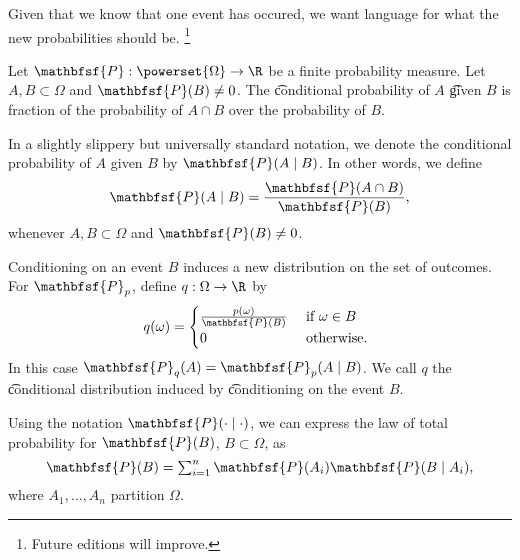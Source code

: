 

Given that we know that one event has occured, we want language for what the new probabilities should be.
  \ifhmode\unskip\fi\footnote{
Future editions will improve.
  }

Let $\mathbfsf{P} : \powerset{\Omega } \to \R $ be a finite probability measure.
Let $A, B \subset \Omega $ and $\mathbfsf{P} (B) \neq 0$.
The \t{conditional probability} of $A$ \t{given} $B$ is fraction of the probability of $A \cap B$ over the probability of $B$.

In a slightly slippery but universally standard notation, we denote the conditional probability of $A$ given $B$ by $\mathbfsf{P} (A \mid B)$.
In other words, we define
  \[
\mathbfsf{P} (A \mid B) = \frac{\mathbfsf{P} (A \cap B)}{\mathbfsf{P} (B)},
  \]
whenever $A, B \subset \Omega $ and $\mathbfsf{P} (B) \neq 0$.

Conditioning on an event $B$ induces a new distribution on the set of outcomes.
For $\mathbfsf{P} _p$, define $q: \Omega  \to \R $ by
  \[
q(\omega ) = \begin{cases}
\frac{p(\omega )}{\mathbfsf{P} (B)} & \text{ if } \omega  \in B \\
0 & \text{ otherwise. } \\
\end{cases}
  \]
In this case $\mathbfsf{P} _q(A) = \mathbfsf{P} _p(A \mid B)$.
We call $q$ the \t{conditional distribution} induced by \t{conditioning on} the event $B$.

Using the notation $\mathbfsf{P} (\cdot \mid \cdot)$, we can express the law of total probability for $\mathbfsf{P} (B)$, $B \subset \Omega $, as
  \[
\textstyle
\mathbfsf{P} (B) = \sum_{i = 1}^{n} \mathbfsf{P} (A_i)\mathbfsf{P} (B \mid A_i),
  \]
where $A_1, \dots, A_n$ partition $\Omega $.
